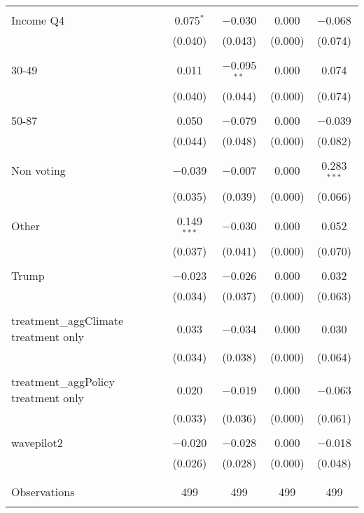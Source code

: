 \begin{tabular}{@{\extracolsep{5pt}}lcccc}
  & & & & \\ 
 Income Q4 & 0.075$^{*}$ & $-$0.030 & 0.000 & $-$0.068 \\ 
  & (0.040) & (0.043) & (0.000) & (0.074) \\ 
  & & & & \\ 
 30-49 & 0.011 & $-$0.095$^{**}$ & 0.000 & 0.074 \\ 
  & (0.040) & (0.044) & (0.000) & (0.074) \\ 
  & & & & \\ 
 50-87 & 0.050 & $-$0.079 & 0.000 & $-$0.039 \\ 
  & (0.044) & (0.048) & (0.000) & (0.082) \\ 
  & & & & \\ 
 Non voting & $-$0.039 & $-$0.007 & 0.000 & 0.283$^{***}$ \\ 
  & (0.035) & (0.039) & (0.000) & (0.066) \\ 
  & & & & \\ 
 Other & 0.149$^{***}$ & $-$0.030 & 0.000 & 0.052 \\ 
  & (0.037) & (0.041) & (0.000) & (0.070) \\ 
  & & & & \\ 
 Trump & $-$0.023 & $-$0.026 & 0.000 & 0.032 \\ 
  & (0.034) & (0.037) & (0.000) & (0.063) \\ 
  & & & & \\ 
 treatment\_aggClimate treatment only & 0.033 & $-$0.034 & 0.000 & 0.030 \\ 
  & (0.034) & (0.038) & (0.000) & (0.064) \\ 
  & & & & \\ 
 treatment\_aggPolicy treatment only & 0.020 & $-$0.019 & 0.000 & $-$0.063 \\ 
  & (0.033) & (0.036) & (0.000) & (0.061) \\ 
  & & & & \\ 
 wavepilot2 & $-$0.020 & $-$0.028 & 0.000 & $-$0.018 \\ 
  & (0.026) & (0.028) & (0.000) & (0.048) \\ 
  & & & & \\ 
\hline \\[-1.8ex] 

Observations & 499 & 499 & 499 & 499 \\ 
\hline 
\hline \\[-1.8ex] 
\end{tabular} 